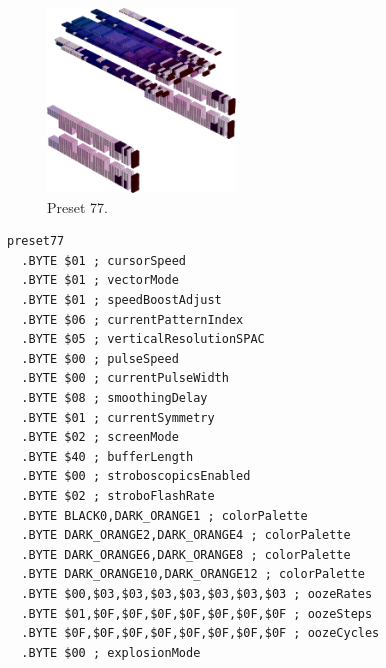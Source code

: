 \vspace*{0.5cm}
\begin{minipage}[b]{0.48\linewidth}
\begin{figure}[H]                                                          
  \centering                                                             
  \begin{adjustbox}{width=5cm,center}                                   
  \includegraphics[width=5cm]{src/colorspace_presets/preset77-45.png}%
  \end{adjustbox}                                                        
\caption*{Preset 77.}                                           
\end{figure}                                                               
\end{minipage}
\hspace{0.1cm}
\begin{minipage}[b]{0.48\linewidth}                                                                         
\begin{lstlisting}[basicstyle=\ttfamily\tiny]
preset77
  .BYTE $01 ; cursorSpeed
  .BYTE $01 ; vectorMode
  .BYTE $01 ; speedBoostAdjust
  .BYTE $06 ; currentPatternIndex
  .BYTE $05 ; verticalResolutionSPAC
  .BYTE $00 ; pulseSpeed
  .BYTE $00 ; currentPulseWidth
  .BYTE $08 ; smoothingDelay
  .BYTE $01 ; currentSymmetry
  .BYTE $02 ; screenMode
  .BYTE $40 ; bufferLength
  .BYTE $00 ; stroboscopicsEnabled
  .BYTE $02 ; stroboFlashRate
  .BYTE BLACK0,DARK_ORANGE1 ; colorPalette
  .BYTE DARK_ORANGE2,DARK_ORANGE4 ; colorPalette
  .BYTE DARK_ORANGE6,DARK_ORANGE8 ; colorPalette
  .BYTE DARK_ORANGE10,DARK_ORANGE12 ; colorPalette
  .BYTE $00,$03,$03,$03,$03,$03,$03,$03 ; oozeRates
  .BYTE $01,$0F,$0F,$0F,$0F,$0F,$0F,$0F ; oozeSteps
  .BYTE $0F,$0F,$0F,$0F,$0F,$0F,$0F,$0F ; oozeCycles
  .BYTE $00 ; explosionMode
\end{lstlisting}
\end{minipage}


